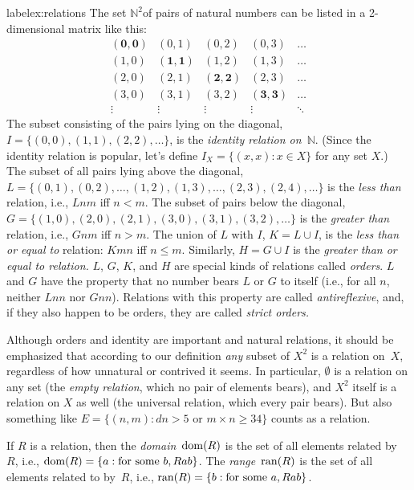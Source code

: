 \documentclass[misc]{subfiles}
\begin{document}
\begin{ex}label{ex:relations}
The set $\mathbb{N}^{2}$of
pairs of natural numbers can be listed in a 2-dimensional matrix like
this:
\[
\begin{array}{ccccc}
\mathbf{(0,0)} & (0,1) & (0,2) & (0,3) & \ldots\\
(1,0) & \mathbf{(1,1)} & (1,2) & (1,3) & \ldots\\
(2,0) & (2,1) & \mathbf{(2,2)} & (2,3) & \ldots\\
(3,0) & (3,1) & (3,2) & \mathbf{(3,3)} & \ldots\\
\vdots & \vdots & \vdots & \vdots & \mathbf{\ddots}
\end{array}
\]
The subset consisting of the pairs lying on the diagonal, $I=\{(0,0),(1,1),(2,2),\ldots\}$,
is the \emph{identity relation on}~$\mathbb{N}$. (Since the identity
relation is popular, let's define $I_{X}=\{(x,x) : x\in X\}$ for any
set $X$.) The subset of all pairs lying above the diagonal, $L = \{(0,1),(0,2),\ldots,(1,2),(1,3),\ldots,(2,3),(2,4),\ldots\}$ is
the \emph{less than} relation, i.e., $Lnm$ iff $n<m$. The subset
of pairs below the diagonal, $G=\{(1,0),(2,0),(2,1),(3,0),(3,1),(3,2),\ldots\}$
is the \emph{greater than} relation, i.e., $Gnm$ iff $n>m$. The
union of $L$ with $I$, $K=L\cup I$, is the \emph{less than or equal
to} relation: $Kmn$ iff $n\le m$. Similarly, $H=G\cup I$ is the
\emph{greater than or equal to relation.} $L$, $G$, $K$, and $H$
are special kinds of relations called \emph{orders}. $L$ and $G$
have the property that no number bears $L$ or $G$ to itself (i.e.,
for all $n$, neither $Lnn$ nor $Gnn$). Relations with this property
are called \emph{antireflexive}, and, if they also happen to be orders,
they are called \emph{strict orders.}

Although orders and identity are important and natural relations,
it should be emphasized that according to our definition \emph{any}
subset of $X^{2}$ is a relation on~$X$, regardless of how unnatural
or contrived it seems. In particular, $\emptyset$ is a relation on
any set (the \emph{empty relation}, which no pair of elements bears),
and $X^{2}$ itself is a relation on $X$ as well (the universal relation, which every
pair bears). But also something like $E=\{(n,m) : d n>5\text{ or }m\times n\ge 34\}$
counts as a relation.
\end{ex}

\begin{defn}
If $R$ is a relation, then the \emph{domain}~$\mathrm{dom}(R)$ is the set of all elements related by~$R$, i.e., $\mathrm{dom}(R) = \{a : \text{for some }b, Rab\}$.
The \emph{range}~$\mathrm{ran}(R)$ is the set of all elements related to by~$R$, i.e., $\mathrm{ran}(R) = \{b : \text{for some }a, Rab\}$.
\end{defn}
\end{document}

